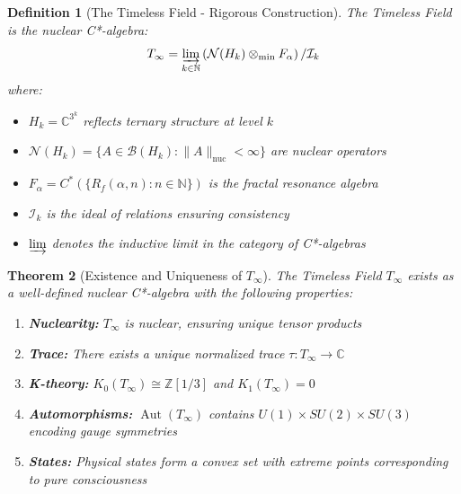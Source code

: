 \documentclass[11pt]{article}
\newtheorem{theorem}{Theorem}[section]
\newtheorem{definition}[theorem]{Definition}
\theoremstyle{definition}
\DeclareMathOperator{\Aut}{Aut}
\begin{document}
\begin{definition}[The Timeless Field - Rigorous Construction]
The Timeless Field is the nuclear C*-algebra:
\begin{equation}
T_\infty = \varinjlim_{k \in \mathbb{N}} \left( \mathcal{N}(H_k) \otimes_{\text{min}} F_\alpha \right) / \mathcal{I}_k
\label{eq:timeless_field_rigorous}
\end{equation}
where:
\begin{itemize}
\item $H_k = \mathbb{C}^{3^k}$ reflects ternary structure at level $k$
\item $\mathcal{N}(H_k) = \{A \in \mathcal{B}(H_k) : \|A\|_{\text{nuc}} < \infty\}$ are nuclear operators
\item $F_\alpha = C^*(\{R_f(\alpha, n) : n \in \mathbb{N}\})$ is the fractal resonance algebra
\item $\mathcal{I}_k$ is the ideal of relations ensuring consistency
\item $\varinjlim$ denotes the inductive limit in the category of C*-algebras
\end{itemize}
\end{definition}

\begin{theorem}[Existence and Uniqueness of $T_\infty$]
\label{thm:timeless_existence_complete}
The Timeless Field $T_\infty$ exists as a well-defined nuclear C*-algebra with the following properties:
\begin{enumerate}
\item \textbf{Nuclearity:} $T_\infty$ is nuclear, ensuring unique tensor products
\item \textbf{Trace:} There exists a unique normalized trace $\tau : T_\infty \to \mathbb{C}$
\item \textbf{K-theory:} $K_0(T_\infty) \cong \mathbb{Z}[1/3]$ and $K_1(T_\infty) = 0$
\item \textbf{Automorphisms:} $\Aut(T_\infty)$ contains $U(1) \times SU(2) \times SU(3)$ encoding gauge symmetries
\item \textbf{States:} Physical states form a convex set with extreme points corresponding to pure consciousness
\end{enumerate}
\end{theorem}
\end{document}
